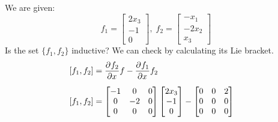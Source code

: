 \ex{}
{
    We are given:
    \begin{equation}
        f_1=\begin{bmatrix}
            2x_3  \\
            -1\\
            0
        \end{bmatrix},\;
        f_2 = \begin{bmatrix}
            -x_1  \\
            -2x_2\\
            x_3
        \end{bmatrix}
    \end{equation}
    Is the set $\{f_1,f_2\}$ inductive? We can check by calculating its Lie bracket.
    \begin{equation}
        \begin{aligned}
            [f_1,f_2]&= \pdv{f_2}{x}f - \pdv{f_1}{x}f_2&\mbox{}\\[1.25ex]
            [f_1,f_2]&= \begin{bmatrix}
                -1 & 0 & 0 \\
                0 &-2 &0\\
                0 &0&0
            \end{bmatrix}\begin{bmatrix}
                2x_3  \\
                -1\\
                0
            \end{bmatrix}
            - \begin{bmatrix}
                0 & 0&2 \\
                0 &0 &0\\
                0 &0 &0


\end{bmatrix}
\end{aligned}
\end{equation}}
